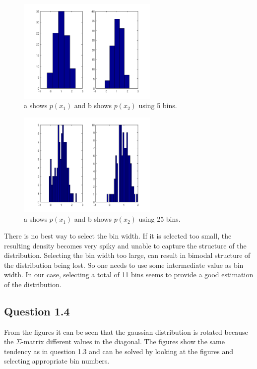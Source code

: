 \documentclass[a4paper, 10pt, final]{article}
\begin{document}
\begin{figure}[!ht]
\centering
\includegraphics[width=0.6\textwidth]{images/q1_3b}
\caption{a shows $p(x_1)$ and b shows $p(x_2)$ using 5 bins.}
\label{fig:q1_3b}
\end{figure}

\begin{figure}[!ht]
\centering
\includegraphics[width=0.6\textwidth]{images/q1_3c}
\caption{a shows $p(x_1)$ and b shows $p(x_2)$ using 25 bins.}
\label{fig:q1_3c}
\end{figure}

There is no best way to select the bin width. If it is selected too
small, the resulting density becomes very spiky and unable to capture
the structure of the distribution. Selecting the bin width too large,
can result in bimodal structure of the distribution being lost. So one
needs to use some intermediate value as bin width. In our case,
selecting a total of 11 bins seems to provide a good estimation of the
distribution.

\subsection*{Question 1.4}

From the figures it can be seen that the gaussian distribution is
rotated because the $\Sigma$-matrix different values in the
diagonal. The figures show the same tendency as in question 1.3 and
can be solved by looking at the figures and selecting appropriate bin
numbers.
\end{document}
